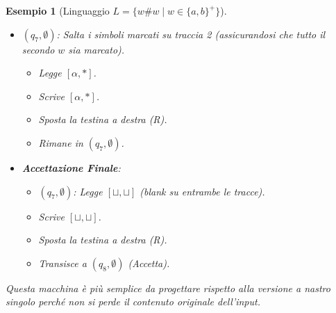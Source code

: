 \documentclass[a4paper, 11pt]{book} %
\newtheorem{example}[theorem]{Esempio}
\theoremstyle{definition}
\begin{document}
\begin{example}[Linguaggio $L = \{w\#w \mid w \in \{a,b\}^+\}$]
\begin{itemize}
\begin{itemize}
\begin{itemize}
\begin{itemize}
                            \item Transisce a $(q_7, \emptyset)$.
                        \end{itemize}
                    \item $(q_7, \emptyset)$: Salta i simboli marcati su traccia 2 (assicurandosi che tutto il secondo $w$ sia marcato).
                        \begin{itemize}
                            \item Legge $[\alpha, *]$.
                            \item Scrive $[\alpha, *]$.
                            \item Sposta la testina a destra (R).
                            \item Rimane in $(q_7, \emptyset)$.
                        \end{itemize}
                    \item \textbf{Accettazione Finale}:
                        \begin{itemize}
                            \item $(q_7, \emptyset)$: Legge $[\sqcup, \sqcup]$ (blank su entrambe le tracce).
                            \item Scrive $[\sqcup, \sqcup]$.
                            \item Sposta la testina a destra (R).
                            \item Transisce a $(q_8, \emptyset)$ (Accetta).
                        \end{itemize}
                \end{itemize}
        \end{itemize}
\end{itemize}
Questa macchina è più semplice da progettare rispetto alla versione a nastro singolo perché non si perde il contenuto originale dell'input.
\end{example}
\end{document}
